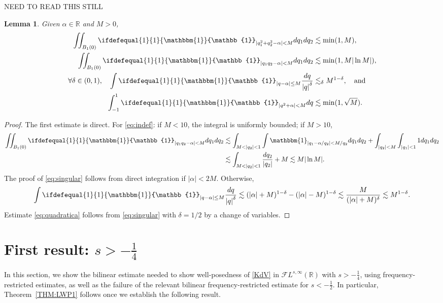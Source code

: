 \documentclass[a4paper, 11pt]{amsart}
\newcommand{\R}{\mathbb{R}}
\newcommand{\m}[1]{
	\ifdefequal{#1}{1}
	{\mathbbm{#1}}
	{\mathbb{#1}}
}
\theoremstyle{plain}
\newtheorem{lem}[thm]{Lemma}
\theoremstyle{definition}
\theoremstyle{remark}
\newcommand{\5}{\text{V}}
\newcommand{\FL}{\mathcal{F} L}
\numberwithin{equation}{section}
\theoremstyle{mytheoremstyle} \newtheorem{nota}[thm]{Remark}
\theoremstyle{mytheoremstyle} \newtheorem{exemplo}[thm]{Example}
\newcommand{\red}{\color{red}}
\newcommand{\blue}{\color{blue}}
\begin{document}
{
\red NEED TO READ THIS STILL

\blue
\begin{lem}\label{lem:quadraticas}
	Given $\alpha\in \R$ and $M>0$,
	\begin{align}\label{eq:posdef}
		\iint_{B_1(0)} \m 1_{|q_1^2+q_2^2-\alpha|<M}dq_1dq_2 &\lesssim \min(1,M), \\\label{eq:indef}
		\iint_{B_1(0)} \m 1_{|q_1q_2-\alpha|<M}dq_1dq_2 &\lesssim \min(1,M|\ln M|), \\
		\label{eq:singular}
		\forall \delta \in (0,1), \quad \int \m 1_{|q-\alpha| \le M} \frac{dq}{\left|q \right|^{\delta}} &\lesssim_{\delta} M^{1-\delta}, \quad \text{and} \quad \\
		\label{eq:quadratica}
		\int_{-1}^{1} \m 1_{|q^2  +\alpha | < M} dq &\lesssim \min(1,\sqrt M).
	\end{align}

\end{lem}

\begin{proof}
	The first estimate is direct. For \eqref{eq:indef}: if $M<10$, the integral is uniformly bounded; if $M>10$,
	\begin{align*}
		\iint_{B_1(0)} \m 1_{|q_1q_2-\alpha|<M}dq_1dq_2 &\lesssim \int_{M<|q_2|<1} \int \mathbbm{1}_{|q_1-\alpha/q_2|<M/q_2} dq_1dq_2 + \int_{|q_2|<M} \int_{|q_1|<1} 1 dq_1dq_2 \\&\lesssim \int_{M<|q_2|<1} \frac{dq_2}{|q_2|} + M \lesssim M|\ln M|.
	\end{align*}
	The proof of \eqref{eq:singular} follows from direct integration if $|\alpha|<2M$. Otherwise,
	$$
	\int \m 1_{|q-\alpha| \le M} \frac{dq}{\left|q \right|^{\delta}} \lesssim (|\alpha|+M)^{1-\delta}-(|\alpha|-M)^{1-\delta}\lesssim \frac{M}{(|\alpha|+M)^{\delta}} \lesssim M^{1-\delta}.
	$$
	Estimate \eqref{eq:quadratica} follows from \eqref{eq:singular} with $\delta=1/2$ by a change of variables.
\end{proof}
}


\section{First result: $s>-\frac14$}

In this section, we show the bilinear estimate needed to show well-posedness of \eqref{KdV} in $\FL^{s,\infty}(\R)$ with $s>-\frac14$, using frequency-restricted estimates, as well as the failure of the relevant bilinear frequency-restricted estimate for $s<-\frac12$.
In particular, Theorem~\ref{THM:LWP1} follows once we establish the following result.
\end{document}
